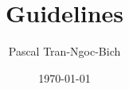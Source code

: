 \documentclass[12pt,english,oneside]{article}
\begin{document}
\title{Guidelines}
\author{Pascal Tran-Ngoc-Bich}
\date{\today}
\maketitle


\end{document}
